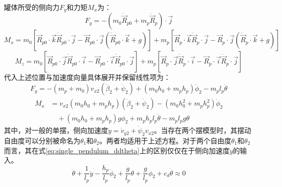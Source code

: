             罐体所受的侧向力$F_y$和力矩$M_x$为：
            \begin{equation}
            F_y = -\left(m_0 \ddot{\vec{R}}_{p0} + m_p \ddot{\vec{R}}_p\right) \cdot \vec{j}
            \end{equation}
            \begin{equation}
            M_x = m_0\left[ \vec{R}_{p0} \cdot \vec{k} \ddot{\vec{R}}_{p0} \cdot \vec{j} - \vec{R}_{p0} \cdot \vec{j} \left( \ddot{\vec{R}}_{p0} \cdot \vec{k} + g \right) \right] + m_p\left[ \vec{R}_p \cdot \vec{k} \ddot{\vec{R}}_p \cdot \vec{j} - \vec{R}_p \cdot \vec{j} \left( \ddot{\vec{R}}_p \cdot \vec{k} + g \right) \right]
            \end{equation}
            \begin{equation}
            M_z = m_0\left[ \vec{R}_{p0} \cdot \vec{j} \ddot{\vec{R}}_{p0} \cdot \vec{i} - \vec{R}_{p0} \cdot \vec{i} \ddot{\vec{R}}_{p0} \cdot \vec{j} \right] + m_p\left[ \vec{R}_p \cdot \vec{j} \ddot{\vec{R}}_p \cdot \vec{i} - \vec{R}_p \cdot \vec{i} \ddot{\vec{R}}_p \cdot \vec{j} \right]
            \end{equation}
            代入上述位置与加速度向量具体展开并保留线性项为：
            \begin{equation}
            F_y = -(m_p + m_0)v_{x2}\left(\ddot{\beta}_2 + \dot{\psi}_2\right) + (m_0 h_0 + m_p h_p)\ddot{\phi}_2 - m_p l_p \ddot{\theta}
            \end{equation}
            \begin{equation}
            \begin{aligned}
            M_x &= v_{x2}(m_0 h_0 + m_p h_p)\left(\ddot{\beta}_2 + \dot{\psi}_2\right) - \left(m_0 h_0^2 + m_p h_p^2\right)\ddot{\phi}_2 \\
            &\quad + (m_0 h_0 + m_p h_p)g \phi_2 + m_p h_p l_p \ddot{\theta} - m_p l_p g \theta
            \end{aligned}
            \end{equation}
            \noindent 其中，对一般的单摆，侧向加速度$\ddot{y} = \dot{v}_{y2} + \dot{\psi}_2 v_{x2}$。当存在两个摆模型时，其摆动自由度可以分别被命名为$\theta_1$和$\theta_2$。两者均适用于上述方程。对于两个自由度$\theta_1$和$\theta_2$而言，其在式\eqref{eq:single_pendulum_ddtheta}上的区别仅仅在于侧向加速度$\ddot{y}$的输入。
            \begin{equation}
            \ddot{\theta} + \frac{1}{l_p} \ddot{y} - \frac{h_p}{l_p} \ddot{\phi}_2 + \frac{g}{l_p} \theta + \frac{g}{l_p} \phi_2 + c_d \dot{\theta} \approx 0
            \label{eq:single_pendulum_ddtheta}
            \end{equation}
